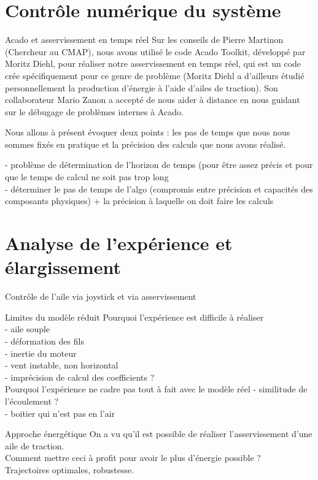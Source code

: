 \documentclass[a4paper,twoside,12pt]{article}
\newcounter{partie}
\newcounter{sous-partie}
\newenvironment{partie}[1]
{
\section{#1}
}
{

}
\newenvironment{sous-partie}[1]
{
\subsection{#1}
}
{

}
\begin{document}
\begin{partie}{Contrôle numérique du système}
\begin{sous-partie}{Acado et asservissement en temps réel}
Sur les conseils de Pierre Martinon (Chercheur au CMAP), nous avons utilisé le code Acado Toolkit, développé par Moritz Diehl, pour réaliser notre asservissement en temps réel, qui est un code crée spécifiquement pour ce genre de problème (Moritz Diehl a d'ailleurs étudié personnellement la production d'énergie à l'aide d'ailes de traction).
Son collaborateur Mario Zanon a accepté de nous aider à distance en nous guidant sur le débugage de problèmes internes à Acado.

Nous allons à présent évoquer deux points : les pas de temps que nous nous sommes fixés en pratique et la précision des calculs que nous avons réalisé.


- problème de détermination de l'horizon de temps (pour être assez précis et pour que le temps de calcul ne soit pas trop long
\\
- déterminer le pas de temps de l'algo (compromis entre précision et capacités des composants physiques) + la précision à laquelle on doit faire les calculs
\end{sous-partie}


\end{partie}

\newpage

\begin{partie}{Analyse de l'expérience et élargissement}

\begin{sous-partie}{Contrôle de l'aile via joystick et via asservissement}

\end{sous-partie}

\begin{sous-partie}{Limites du modèle réduit }
Pourquoi l'expérience est difficile à réaliser
\\
- aile souple
\\
- déformation des fils
\\
- inertie du moteur
\\
- vent instable, non horizontal
\\
- imprécision de calcul des coefficients ?
\\
Pourquoi l'expérience ne cadre pas tout à fait avec le modèle réel
- similitude de l'écoulement ?
\\
- boitier qui n'est pas en l'air
\end{sous-partie}

\begin{sous-partie}{Approche énergétique}
On a vu qu'il est possible de réaliser  l'asservissement d'une aile de traction.
\\
Comment mettre ceci à profit pour avoir le plus d'énergie possible ?
\\
Trajectoires optimales, robustesse.
\end{sous-partie}

\end{partie}
\end{document}
